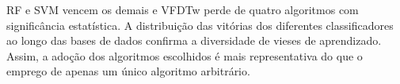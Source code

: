 RF e SVM vencem os demais e VFDTw perde de quatro algoritmos
com significância estatística.
A distribuição das vitórias dos diferentes classificadores ao longo das bases de dados
confirma a diversidade de vieses de aprendizado.
Assim, a adoção dos algoritmos escolhidos é mais representativa do que
o emprego de apenas um único algoritmo arbitrário.

